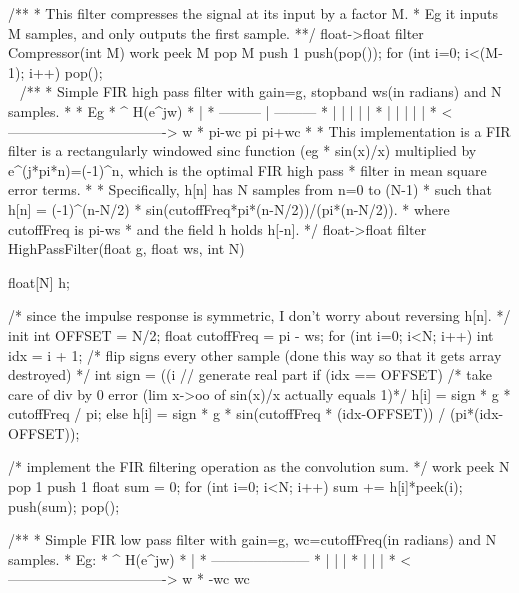 /**
 * This filter compresses the signal at its input by a factor M.
 * Eg it inputs M samples, and only outputs the first sample.
 **/
float->float filter Compressor(int M) {
    work peek M pop M push 1 {
        push(pop());
        for (int i=0; i<(M-1); i++) {
            pop();
        }
    }
}
\newpage~\\~\vspace{-5\baselineskip}\enlargethispage{\baselineskip}
/** 
 * Simple FIR high pass filter with gain=g, stopband ws(in radians) and N samples.
 *
 * Eg
 *                 ^ H(e^jw)
 *                 |
 *      ---------  |     ---------
 *     |      |    |    |     |
 *     |      |    |    |     |
 *    <----------------------------------> w
 *                  pi-wc pi pi+wc
 *
 * This implementation is a FIR filter is a rectangularly windowed sinc function (eg
 * sin(x)/x) multiplied by e^(j*pi*n)=(-1)^n, which is the optimal FIR high pass
 * filter in mean square error terms.
 *
 * Specifically, h[n] has N samples from n=0 to (N-1)
 * such that h[n] = (-1)^(n-N/2) * sin(cutoffFreq*pi*(n-N/2))/(pi*(n-N/2)).
 * where cutoffFreq is pi-ws
 * and the field h holds h[-n].
 */
float->float filter HighPassFilter(float g, float ws, int N) {
    float[N] h;

    /* since the impulse response is symmetric, I don't worry about reversing h[n]. */
    init {
        int OFFSET = N/2;
        float cutoffFreq = pi - ws;
        for (int i=0; i<N; i++) {
            int idx = i + 1;
            /* flip signs every other sample (done this way so that it gets array destroyed) */
            int sign = ((i%
            // generate real part
            if (idx == OFFSET) 
                /* take care of div by 0 error (lim x->oo of sin(x)/x actually equals 1)*/
                h[i] = sign * g * cutoffFreq / pi; 
            else 
                h[i] = sign * g * sin(cutoffFreq * (idx-OFFSET)) / (pi*(idx-OFFSET));
        }
    }

    /* implement the FIR filtering operation as the convolution sum. */
    work peek N pop 1 push 1 {
        float sum = 0;
        for (int i=0; i<N; i++) { 
            sum += h[i]*peek(i);
        }
        push(sum);
        pop();
    }
}
/** 
 * Simple FIR low pass filter with gain=g, wc=cutoffFreq(in radians) and N samples.
 * Eg:
 *                 ^ H(e^jw)
 *                 |
 *          ---------------------
 *          |      |      |
 *          |      |      |
 *    <----------------------------------> w
 *         -wc            wc
